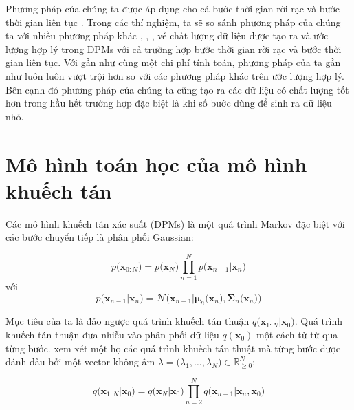 \documentclass[14pt, a4paper]{article}
\numberwithin{equation}{section}
\numberwithin{figure}{section}
\numberwithin{dl}{section}
\numberwithin{md}{section}
\numberwithin{bd}{section}
\numberwithin{dn}{section}
\numberwithin{hq}{section}
\begin{document}
    Phương pháp của chúng ta được áp dụng cho cả bước thời gian rời rạc \cite{ho2020denoising} và bước thời gian liên tục \cite{song2020score}.
    Trong các thí nghiệm, ta sẽ so sánh phương pháp của chúng ta với nhiều phương pháp khác \cite{ho2020denoising}, \cite{song2020denoising}, \cite{bao2021analytic}, \cite{song2020score} về chất lượng dữ liệu được tạo ra và ước lượng hợp lý trong DPMs với cả trường hợp bước thời gian rời rạc và bước thời gian liên tục.
    Với gần như cùng một chi phí tính toán, phương pháp của ta gần như luôn luôn vượt trội hơn so với các phương pháp khác trên ước lượng hợp lý.
    Bên cạnh đó phương pháp của chúng ta cũng tạo ra các dữ liệu có chất lượng tốt hơn trong hầu hết trường hợp đặc biệt là khi số bước dùng để sinh ra dữ liệu nhỏ.

    \section{Mô hình toán học của mô hình khuếch tán} \label{Background}

    Các mô hình khuếch tán xác suất (DPMs) là một quá trình Markov đặc biệt với các bước chuyển tiếp là phân phối Gaussian:

    \begin{equation} \label{eq:Reverse-Process}
        p\big(\boldsymbol{x}_{0:N}\big)=p\big(\boldsymbol{x}_N\big)\prod_{n=1}^N p\big(\boldsymbol{x}_{n-1} \vert \boldsymbol{x}_n\big)
    \end{equation}
    với
    \begin{equation}
        p\big(\boldsymbol{x}_{n-1} \vert \boldsymbol{x}_n \big)=\mathcal{N} \big( \boldsymbol{x}_{n-1} \vert \boldsymbol{\mu}_n \big( \boldsymbol{x}_n \big), \boldsymbol{\Sigma}_n \big( \boldsymbol{x}_n \big) \big)
    \end{equation}

    Mục tiêu của ta là đảo ngược quá trình khuếch tán thuận $q\big(\boldsymbol{x}_{1:N} \vert \boldsymbol{x}_0\big)$. 
    Quá trình khuếch tán thuận đưa nhiễu vào phân phối dữ liệu $q(\boldsymbol{x}_0)$ một cách từ từ qua từng bước.
    \cite{song2020denoising} xem xét một họ các quá trình khuếch tán thuật mà từng bước được đánh dấu bởi một vector không âm $\lambda = \big( \lambda_1, \dots, \lambda_N \big) \in \mathbb{R}_{\geq 0}^{N}$:

    \begin{equation} \label{eq:Forward-Process}
        q\big(\boldsymbol{x}_{1:N} \vert \boldsymbol{x}_0 \big)=q\big( \boldsymbol{x}_N \vert \boldsymbol{x}_0 \big) \prod_{n=2}^{N} q\big( \boldsymbol{x}_{n-1} \vert \boldsymbol{x}_n, \boldsymbol{x}_0 \big)
    \end{equation}
\end{document}
